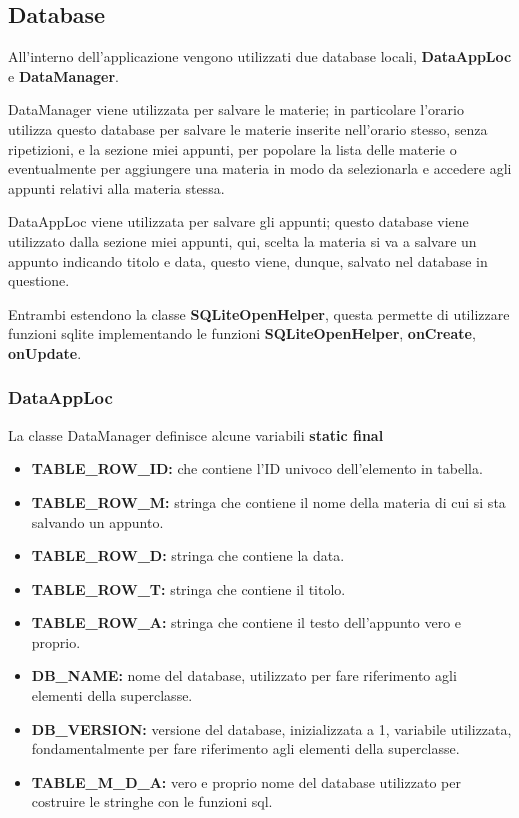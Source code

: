 \documentclass[a4paper, 50pt, twoside]{article}
\begin{document}
\subsection{Database}
All'interno dell'applicazione vengono utilizzati due database locali, \textbf{DataAppLoc} e \textbf{DataManager}.

DataManager viene utilizzata per salvare le materie; in particolare l'orario utilizza questo database per salvare le materie inserite nell'orario stesso, senza ripetizioni, e la sezione miei appunti, per popolare la lista delle materie o eventualmente per aggiungere una materia in modo da selezionarla e accedere agli appunti relativi alla materia stessa.

DataAppLoc viene utilizzata per salvare gli appunti; questo database viene utilizzato dalla sezione miei appunti, qui, scelta la materia si va a salvare un appunto indicando titolo e data, questo viene, dunque, salvato nel database in questione.

Entrambi estendono la classe \textbf{SQLiteOpenHelper}, questa permette di utilizzare funzioni sqlite implementando le funzioni \textbf{SQLiteOpenHelper}, \textbf{onCreate}, \textbf{onUpdate}.

\subsubsection{DataAppLoc}
La classe DataManager definisce alcune variabili \textbf{static final} 
\begin{itemize}
\item \textbf{TABLE\_ROW\_ID:} che contiene l'ID univoco dell'elemento in tabella.
\item \textbf{TABLE\_ROW\_M:} stringa che contiene il nome della materia di cui si sta salvando un appunto.
\item \textbf{TABLE\_ROW\_D:} stringa che contiene la data.
\item \textbf{TABLE\_ROW\_T:} stringa che contiene il titolo.
\item \textbf{TABLE\_ROW\_A:} stringa che contiene il testo dell'appunto vero e proprio.
\item \textbf{DB\_NAME:} nome del database, utilizzato per fare riferimento agli elementi della superclasse.
\item \textbf{DB\_VERSION:} versione del database, inizializzata a 1, variabile utilizzata, fondamentalmente per fare riferimento agli elementi della superclasse.
\item \textbf{TABLE\_M\_D\_A:} vero e proprio nome del database utilizzato per costruire le stringhe con le funzioni sql.
\end{itemize}
\end{document}
